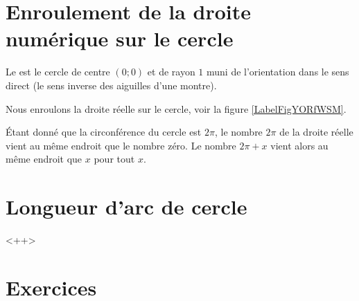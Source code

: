 
\section{Enroulement de la droite numérique sur le cercle}

\begin{definition}
    Le  est le cercle de centre \( (0;0)\) et de rayon \( 1\) muni de l'orientation dans le sens direct (le sens inverse des aiguilles d'une montre).
\end{definition}

Nous enroulons la droite réelle sur le cercle, voir la figure \ref{LabelFigYORfWSM}. %
\newcommand{\CaptionFigYORfWSM}{Un cercle trigonométrique avec enroulement de la droite rélle.}


Étant donné que la circonférence du cercle est \( 2\pi\), le nombre \( 2\pi\) de la droite réelle vient au même endroit que le nombre zéro. Le nombre \( 2\pi+x\) vient alors au même endroit que \( x\) pour tout \( x\).

\section{Longueur d'arc de cercle}

<++>

\section{Exercices}


